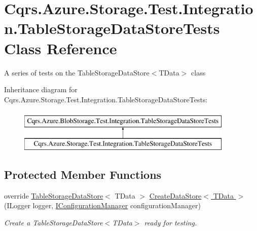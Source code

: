 \hypertarget{classCqrs_1_1Azure_1_1Storage_1_1Test_1_1Integration_1_1TableStorageDataStoreTests}{}\section{Cqrs.\+Azure.\+Storage.\+Test.\+Integration.\+Table\+Storage\+Data\+Store\+Tests Class Reference}
\label{classCqrs_1_1Azure_1_1Storage_1_1Test_1_1Integration_1_1TableStorageDataStoreTests}


A series of tests on the Table\+Storage\+Data\+Store$<$\+T\+Data$>$ class  


Inheritance diagram for Cqrs.\+Azure.\+Storage.\+Test.\+Integration.\+Table\+Storage\+Data\+Store\+Tests\+:\begin{figure}[H]
\begin{center}
\leavevmode
\includegraphics[height=2.000000cm]{classCqrs_1_1Azure_1_1Storage_1_1Test_1_1Integration_1_1TableStorageDataStoreTests}
\end{center}
\end{figure}
\subsection*{Protected Member Functions}
\begin{DoxyCompactItemize}
\item 
override \hyperlink{classCqrs_1_1Azure_1_1BlobStorage_1_1DataStores_1_1TableStorageDataStore}{Table\+Storage\+Data\+Store}$<$ T\+Data $>$ \hyperlink{classCqrs_1_1Azure_1_1Storage_1_1Test_1_1Integration_1_1TableStorageDataStoreTests_a4c23960b33f58ea56707d736616a9f53_a4c23960b33f58ea56707d736616a9f53}{Create\+Data\+Store$<$ T\+Data $>$} (I\+Logger logger, \hyperlink{interfaceCqrs_1_1Configuration_1_1IConfigurationManager}{I\+Configuration\+Manager} configuration\+Manager)
\begin{DoxyCompactList}\small\item\em Create a Table\+Storage\+Data\+Store$<$\+T\+Data$>$ ready for testing. \end{DoxyCompactList}\end{DoxyCompactItemize}
